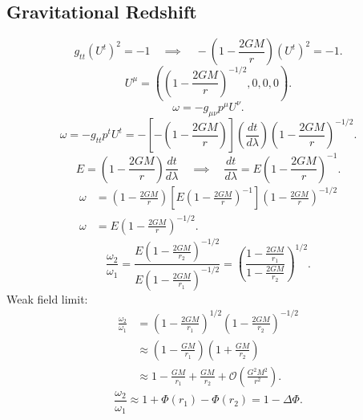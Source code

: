 \documentclass[11pt, a4paper]{report}
\begin{document}
\subsection{Gravitational Redshift}
\begin{equation}
g_{tt}(U^{t})^{2} = -1 \quad \implies \quad -\left(1-\frac{2GM}{r}\right)(U^{t})^{2} = -1.
\end{equation}
\begin{equation}
U^{\mu} = \left( \left(1-\frac{2GM}{r}\right)^{-1/2}, 0, 0, 0 \right).
\end{equation}
\begin{equation}
\omega = -g_{\mu\nu}p^{\mu}U^{\nu}.
\end{equation}
\begin{equation}
\omega = -g_{tt} p^{t} U^{t} = -\left[ -\left(1-\frac{2GM}{r}\right) \right] \left( \frac{dt}{d\lambda} \right) \left(1-\frac{2GM}{r}\right)^{-1/2}.
\end{equation}
\begin{equation}
E = \left(1-\frac{2GM}{r}\right)\frac{dt}{d\lambda} \quad \implies \quad \frac{dt}{d\lambda} = E \left(1-\frac{2GM}{r}\right)^{-1}.
\end{equation}
\begin{align}
\omega &= \left(1-\frac{2GM}{r}\right) \left[ E \left(1-\frac{2GM}{r}\right)^{-1} \right] \left(1-\frac{2GM}{r}\right)^{-1/2} \nonumber \\
\omega &= E \left(1-\frac{2GM}{r}\right)^{-1/2}.
\end{align}
\begin{equation}
\frac{\omega_{2}}{\omega_{1}} = \frac{ E \left(1-\frac{2GM}{r_{2}}\right)^{-1/2} }{ E \left(1-\frac{2GM}{r_{1}}\right)^{-1/2} } = \left( \frac{1-\frac{2GM}{r_{1}}}{1-\frac{2GM}{r_{2}}} \right)^{1/2}.
\end{equation}
Weak field limit:
\begin{align}
\frac{\omega_{2}}{\omega_{1}} &= \left(1-\frac{2GM}{r_{1}}\right)^{1/2} \left(1-\frac{2GM}{r_{2}}\right)^{-1/2} \nonumber \\
&\approx \left(1 - \frac{GM}{r_{1}}\right) \left(1 + \frac{GM}{r_{2}}\right) \nonumber \\
&\approx 1 - \frac{GM}{r_{1}} + \frac{GM}{r_{2}} + \mathcal{O}\left(\frac{G^{2}M^{2}}{r^{2}}\right).
\end{align}
\begin{equation}
\frac{\omega_{2}}{\omega_{1}} \approx 1 + \Phi(r_{1}) - \Phi(r_{2}) = 1 - \Delta\Phi.
\end{equation}
\end{document}
